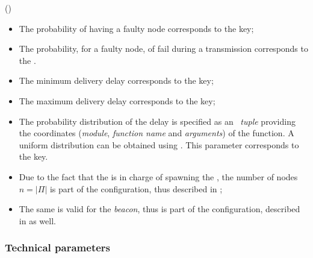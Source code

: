     ()

    \begin{itemize}

    \item   The probability of having a faulty node 
            corresponds to the  key;

    \item   The probability, for a faulty node, of fail during a
            transmission  corresponds to the
            .

    \item   The minimum delivery delay  corresponds
            to the  key;

    \item   The maximum delivery delay  corresponds
            to the  key;

    \item   The probability distribution of the delay 
            is specified as an \Erlang\ \emph{tuple} 
            providing the coordinates (\emph{module}, \emph{function name}
            and \emph{arguments}) of the function. A uniform distribution
            can be obtained using . This
            parameter corresponds to the  key.

    \item   Due to the fact that the  is in charge of
            spawning the , the number of nodes $n =
            \left|\Pi\right|$ is part of the 
            configuration, thus described in
            ;

    \item   The same is valid for the \emph{beacon}, thus
             is part of the 
            configuration, described in
             as well.

    \end{itemize}

\subsubsection{Technical parameters}
\label{subsub:ConfTechParams}

